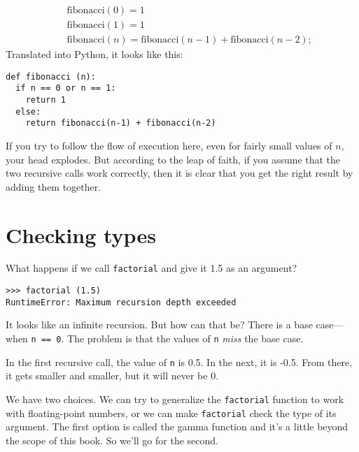\vspace{-0.25in}
\begin{eqnarray*}
&& \mathrm{fibonacci}(0) = 1 \\
&& \mathrm{fibonacci}(1) = 1 \\
&& \mathrm{fibonacci}(n) = \mathrm{fibonacci}(n-1) + \mathrm{fibonacci}(n-2);
\end{eqnarray*}
%
Translated into Python, it looks like this:

\beforeverb
\begin{verbatim}
def fibonacci (n):
  if n == 0 or n == 1:
    return 1
  else:
    return fibonacci(n-1) + fibonacci(n-2)
\end{verbatim}
\afterverb
%
If you try to follow the flow of execution here, even for fairly
small values of $n$, your head explodes.  But according to the
leap of faith, if you assume that the two recursive calls
work correctly, then it is clear that you get
the right result by adding them together.


\section{Checking types}

What happens if we call {\tt factorial} and give it 1.5 as an argument?

\beforeverb
\begin{verbatim}
>>> factorial (1.5)
RuntimeError: Maximum recursion depth exceeded
\end{verbatim}
\afterverb
%
It looks like an infinite recursion.  But how can that be?  There is a
base case---when {\tt n == 0}.  The problem is that the values
of {\tt n} {\em miss} the base case.


In the first recursive call, the value of {\tt n} is 0.5.
In the next, it is -0.5.  From there, it gets smaller and
smaller, but it will never be 0.

We have two choices.  We can try to generalize the {\tt factorial}
function to work with floating-point numbers, or we can make
{\tt factorial} check the type of its argument.  The first option
is called the gamma function and it's a little beyond the
scope of this book.  So we'll go for the
second.


